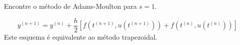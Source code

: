 \begin{exer}
Encontre o método de Adams-Moulton para $s=1$.
\end{exer}
\begin{resp}
 \begin{equation*}
  y^{(n+1)}=y^{(n)}+\frac{h}{2}\left[f\left(t^{(n+1)},u(t^{(n+1)})\right)+f\left(t^{(n)},u(t^{(n)})\right)\right]
 \end{equation*}
 Este esquema é equivalente ao método trapezoidal.
 \end{resp}

  
%  
% 
% 
% 
% 
% 
% 
% 
